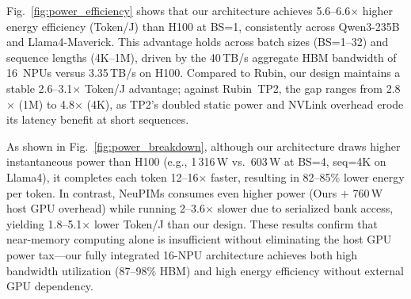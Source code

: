 
Fig.~\ref{fig:power_efficiency} shows that our architecture achieves 5.6--6.6$\times$ higher energy efficiency (Token/J) than H100 at BS=1, consistently across Qwen3-235B and Llama4-Maverick.
This advantage holds across batch sizes (BS=1--32) and sequence lengths (4K--1M), driven by the 40\,TB/s aggregate HBM bandwidth of 16~NPUs versus 3.35\,TB/s on H100.
Compared to Rubin, our design maintains a stable 2.6--3.1$\times$ Token/J advantage; against Rubin~TP2, the gap ranges from 2.8$\times$ (1M) to 4.8$\times$ (4K), as TP2's doubled static power and NVLink overhead erode its latency benefit at short sequences.

As shown in Fig.~\ref{fig:power_breakdown}, although our architecture draws higher instantaneous power than H100 (e.g., 1\,316\,W vs.\ 603\,W at BS=4, seq=4K on Llama4), it completes each token 12--16$\times$ faster, resulting in 82--85\% lower energy per token.
In contrast, NeuPIMs consumes even higher power (Ours $+$ 760\,W host GPU overhead) while running 2--3.6$\times$ slower due to serialized bank access, yielding 1.8--5.1$\times$ lower Token/J than our design.
These results confirm that near-memory computing alone is insufficient without eliminating the host GPU power tax---our fully integrated 16-NPU architecture achieves both high bandwidth utilization (87--98\% HBM) and high energy efficiency without external GPU dependency.
